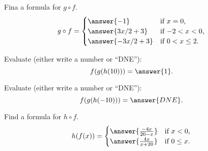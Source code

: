 \documentclass{ximera}
\begin{document}
\begin{exercise}
  Fina a formula for $g\circ f$.
  \[
  g\circ f =
  \begin{cases}
    \answer{-1} & \text{if $x=0$,}\\
    \answer{3x/2 + 3} &\text{if $-2<x<0$,}\\
    \answer{-3x/2 + 3}&\text{if $0<x\le 2$.}
  \end{cases}
  \]
\end{exercise}
\begin{exercise}
  Evaluate (either write a number or ``DNE''):
    \[
    f(g(h(10))) = \answer{1}.
    \]
  \end{exercise}
  \begin{exercise}
    Evaluate (either write a number or ``DNE''):
    \[
    f(g(h(-10))) = \answer{DNE}.
    \]
  \end{exercise}
  \begin{exercise}
    Find a formula for $h\circ f$.
    \[
    h(f(x)) =
    \begin{cases}
      \answer{\frac{-4x}{20-x}} & \text{if $x<0$,}\\
      \answer{\frac{4x}{x+20}}  & \text{if $0\le x$.}
    \end{cases}
    \]
  \end{exercise}
\end{document}
